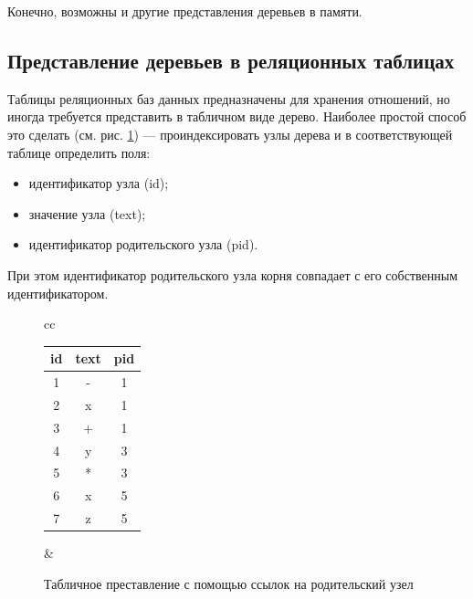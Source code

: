 Конечно, возможны и другие представления деревьев в памяти.


\subsection{Представление деревьев в реляционных таблицах}

Таблицы реляционных баз данных предназначены для хранения отношений, но иногда требуется представить в табличном виде дерево. Наиболее простой способ это сделать (см. рис. \ref{fig:rec:treeRepParent}) --- проиндексировать узлы дерева и в соответствующей таблице определить поля:
\begin{itemize}
    \item идентификатор узла (id);
    \item значение узла (text);
    \item идентификатор родительского узла (pid).
\end{itemize}

При этом идентификатор родительского узла корня совпадает с его собственным идентификатором.
\begin{figure}
    \centering
    \begin{tabular}{cc}
        \begin{tabular}{|c|c|c|}
            \hline\hline
            id  &text   &pid \\
            \hline\hline
            1   &-      &1 \\ \hline
            2   &x      &1 \\ \hline
            3   &+      &1 \\ \hline
            4   &y      &3 \\ \hline
            5   &*      &3 \\ \hline
            6   &x      &5 \\ \hline
            7   &z      &5 \\ \hline
        \end{tabular}
        &
    \end{tabular}
    \caption{Табличное преставление с помощью ссылок на родительский узел}
    \label{fig:rec:treeRepParent}
\end{figure}

